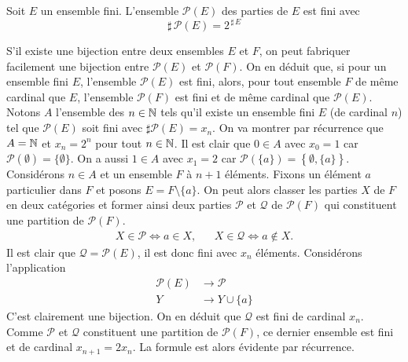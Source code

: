 \begin{propn}
Soit $E$ un ensemble fini. L'ensemble $\mathcal P(E)$ des parties de $E$ est fini avec
\begin{displaymath}
 \sharp\, \mathcal P(E) = 2^{\,\sharp\, E}
\end{displaymath}
\end{propn}
\begin{demo}
 S'il existe une bijection entre deux ensembles $E$ et $F$, on peut fabriquer facilement une bijection entre $\mathcal{P}(E)$ et $\mathcal{P}(F)$. On en déduit que, si pour un ensemble fini $E$, l'ensemble $\mathcal{P}(E)$ est fini, alors, pour tout ensemble $F$ de même cardinal que $E$, l'ensemble $\mathcal{P}(F)$ est fini et de même cardinal que $\mathcal{P}(E)$.\newline
Notons $A$ l'ensemble des $n\in \mathbb{N}$ tels qu'il existe un ensemble fini $E$ (de cardinal $n$) tel que $\mathcal{P}(E)$ soit fini avec $\sharp \mathcal{P}(E) = x_n$.\newline
On va montrer par récurrence que $A=\mathbb{N}$ et $x_n=2^n$ pour tout $n\in \mathbb{N}$.\newline
Il est clair que $0\in A$ avec $x_0=1$ car $\mathcal{P}(\emptyset)=\{\emptyset\}$. On a aussi $1\in A$ avec $x_1=2$ car $\mathcal{P}(\{a\})=\left\lbrace \emptyset, \{a\}\right\rbrace$.\newline
Considérons $n\in A$ et un ensemble $F$ à $n+1$ éléments.\newline
Fixons un élément $a$ particulier dans $F$ et posons $E=F\setminus\{a\}$. On peut alors classer les parties $X$ de $F$ en deux catégories et former ainsi deux parties $\mathcal P$ et $\mathcal Q$ de $\mathcal P(F)$ qui constituent une partition de $\mathcal{P}(F)$.
\begin{align*}
 X\in \mathcal P \Leftrightarrow a \in X,  & & 
 X\in \mathcal Q \Leftrightarrow a \not\in X .
\end{align*}
Il est clair que $\mathcal{Q}=\mathcal{P}(E)$, il est donc fini avec $x_n$ éléments. Considérons l'application
\begin{displaymath}
 \begin{aligned}
  \mathcal{P}(E) &\rightarrow \mathcal P\\
  Y &\rightarrow Y\cup \{a\}
 \end{aligned}
\end{displaymath}
C'est clairement une bijection. On en déduit que $\mathcal Q$ est fini de cardinal $x_n$. Comme $\mathcal{P}$ et $\mathcal{Q}$ constituent une partition de $\mathcal{P}(F)$, ce dernier ensemble est fini et de cardinal $x_{n+1}=2x_n$. La formule est alors évidente par récurrence.
\end{demo}

